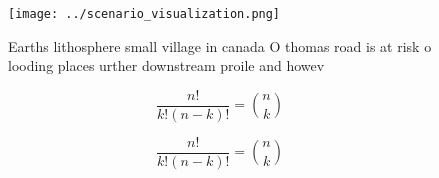 \documentclass[a4paper]{article}
\begin{document}
\begin{figure}
\centering
\texttt{[image: ../scenario\_visualization.png]}
\caption{Earths lithosphere small village in canada O thomas road is at risk o looding places urther downstream proile and howev
}
\end{figure}
 
\[ \frac{n!}{k!(n-k)!} = \binom{n}{k} \]

\[ \frac{n!}{k!(n-k)!} = \binom{n}{k} \]
\end{document}
